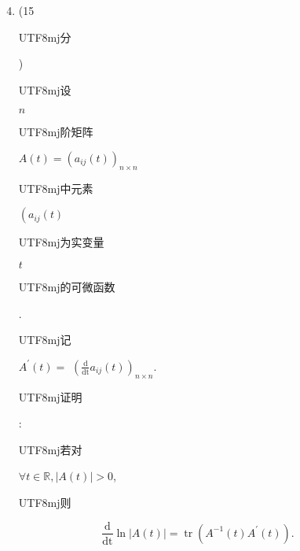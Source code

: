 \documentclass[10pt]{article}
\begin{document}
\begin{enumerate}
  \setcounter{enumi}{3}
  \item (15 \begin{CJK}{UTF8}{mj}分\end{CJK}) \begin{CJK}{UTF8}{mj}设\end{CJK} $n$ \begin{CJK}{UTF8}{mj}阶矩阵\end{CJK} $A(t)=\left(a_{i j}(t)\right)_{n \times n}$ \begin{CJK}{UTF8}{mj}中元素\end{CJK} $\left(a_{i j}(t)\right.$ \begin{CJK}{UTF8}{mj}为实变量\end{CJK} $t$ \begin{CJK}{UTF8}{mj}的可微函数\end{CJK}. \begin{CJK}{UTF8}{mj}记\end{CJK} $A^{\prime}(t)=$ $\left(\frac{\mathrm{d}}{\mathrm{dt}} a_{i j}(t)\right)_{n \times n}$. \begin{CJK}{UTF8}{mj}证明\end{CJK}: \begin{CJK}{UTF8}{mj}若对\end{CJK} $\forall t \in \mathbb{R},|A(t)|>0$, \begin{CJK}{UTF8}{mj}则\end{CJK}
\end{enumerate}
$$
\frac{\mathrm{d}}{\mathrm{dt}} \ln |A(t)|=\operatorname{tr}\left(A^{-1}(t) A^{\prime}(t)\right) .
$$
\end{document}
